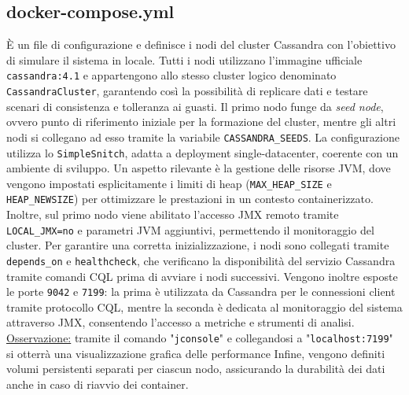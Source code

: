 \documentclass[12pt]{article}
\begin{document}
\subsection{docker-compose.yml}
È un file di configurazione e definisce i nodi del cluster Cassandra con l’obiettivo di simulare il sistema in locale.\newline
Tutti i nodi utilizzano l’immagine ufficiale \texttt{cassandra:4.1} e appartengono allo stesso cluster logico denominato \texttt{CassandraCluster}, garantendo così la possibilità di replicare dati e testare scenari di consistenza e tolleranza ai guasti.\newline\newline
\noindent
Il primo nodo funge da \textit{seed node}, ovvero punto di riferimento iniziale per la formazione del cluster, mentre gli altri nodi si collegano ad esso tramite la variabile \texttt{CASSANDRA\_SEEDS}. La configurazione utilizza lo \texttt{SimpleSnitch}, adatta a deployment single-datacenter, coerente con un ambiente di sviluppo.\newline\newline
\noindent
Un aspetto rilevante è la gestione delle risorse JVM, dove vengono impostati esplicitamente i limiti di heap (\texttt{MAX\_HEAP\_SIZE} e \texttt{HEAP\_NEWSIZE}) per ottimizzare le prestazioni in un contesto containerizzato. Inoltre, sul primo nodo viene abilitato l’accesso JMX remoto tramite \texttt{LOCAL\_JMX=no} e parametri JVM aggiuntivi, permettendo il monitoraggio del cluster.\newline\newline
\noindent
Per garantire una corretta inizializzazione, i nodi sono collegati tramite \texttt{depends\_on} e \texttt{healthcheck}, che verificano la disponibilità del servizio Cassandra tramite comandi CQL prima di avviare i nodi successivi.\newline\newline
\noindent
Vengono inoltre esposte le porte \texttt{9042} e \texttt{7199}: la prima è utilizzata da Cassandra per le connessioni client tramite protocollo CQL, mentre la seconda è dedicata al monitoraggio del sistema attraverso JMX, consentendo l’accesso a metriche e strumenti di analisi.\newline
\underline{Osservazione:} tramite il comando "\texttt{jconsole}" e collegandosi a "\texttt{localhost:7199}" si otterrà una visualizzazione grafica delle performance\newline\newline
\noindent
Infine, vengono definiti volumi persistenti separati per ciascun nodo, assicurando la durabilità dei dati anche in caso di riavvio dei container.
\end{document}
